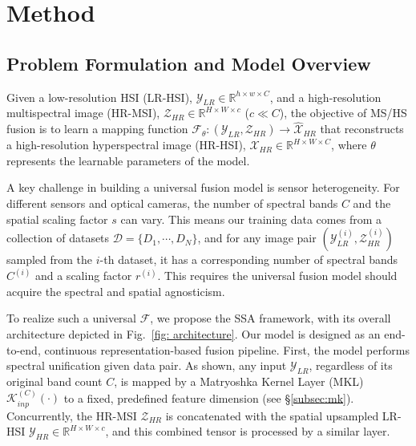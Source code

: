 \section{Method}
\label{sec:method}
\subsection{Problem Formulation and Model Overview}

\newcommand{\xhr}{\mathcal{X}_{HR}}
\newcommand{\wxhr}{\widehat{\mathcal{X}}_{HR}}
\newcommand{\ylr}{\mathcal{Y}_{LR}}
\newcommand{\yhr}{\mathcal Y_{HR}}
\newcommand{\zhr}{\mathcal{Z}_{HR}}
\newcommand{\deltax}{\Delta \widehat{\mathcal X}}
\newcommand{\deltaxp}{\Delta \widehat{\mathcal X}^\prime}
\newcommand{\kinp}{\mathcal K_{inp}}
\newcommand{\koup}{\mathcal K_{outp}}


Given a low-resolution HSI (LR-HSI), $\mathcal{Y}_{LR} \in \mathbb{R}^{h \times w \times C}$, and a high-resolution multispectral image (HR-MSI), $\mathcal{Z}_{HR} \in \mathbb{R}^{H \times W \times c}$ ($c \ll C$), the objective of MS/HS fusion is to learn a mapping function $\mathcal{F}_\theta: (\ylr, \zhr)\to\wxhr$ that reconstructs a high-resolution hyperspectral image (HR-HSI), $\mathcal{X}_{HR} \in \mathbb{R}^{H \times W \times C}$, where $\theta$ represents the learnable parameters of the model.


A key challenge in building a universal fusion model is sensor heterogeneity. For different sensors and optical cameras, the number of spectral bands $C$ and the spatial scaling factor $s$ can vary. This means our training data comes from a collection of datasets $\mathcal D=\{D_1, \cdots, D_N\}$, and for any image pair $(\ylr^{(i)}, \zhr^{(i)})$ sampled from the $i$-th dataset, it has a corresponding number of spectral bands $C^{(i)}$ and a scaling factor $r^{(i)}$. This requires the universal fusion model should acquire the spectral and spatial agnosticism.

To realize such a universal $\mathcal F$, we propose the SSA framework, with its overall architecture depicted in Fig.~\ref{fig: architecture}. Our model is designed as an end-to-end, continuous representation-based fusion pipeline.
First, the model performs spectral unification given data pair.
As shown, any input $\ylr$, regardless of its original band count $C$, is mapped by a Matryoshka Kernel Layer (MKL) $\mathcal K_{inp}^{(C)}(\cdot)$ to a fixed, predefined feature dimension (see \S \ref{subsec:mk}).
Concurrently, the HR-MSI $\zhr$ is concatenated with the spatial upsampled LR-HSI $\yhr\in \mathbb R^{H\times W\times c}$, and this combined tensor is processed by a similar layer.


